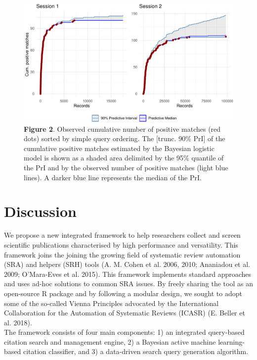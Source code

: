\documentclass{article}
\begin{document}
\begin{figure}
\centering
\includegraphics{Manuscript_files/figure-latex/performance_plot-1.pdf}
\caption{\textbf{Figure 2}. Observed cumulative number of positive
matches (red dots) sorted by simple query ordering. The {[}trunc. 90\%
PrI{]} of the cumulative positive matches estimated by the Bayesian
logistic model is shown as a shaded area delimited by the 95\% quantile
of the PrI and by the observed number of positive matches (light blue
lines). A darker blue line represents the median of the PrI.}
\end{figure}

\hypertarget{discussion}{%
\section{Discussion}\label{discussion}}

We propose a new integrated framework to help researchers collect and
screen scientific publications characterised by high performance and
versatility. This framework joins the joining the growing field of
systematic review automation (SRA) and helpers (SRH) tools (A. M. Cohen
et al. 2006, 2010; Ananiadou et al. 2009; O'Mara-Eves et al. 2015). This
framework implements standard approaches and uses ad-hoc solutions to
common SRA issues. By freely sharing the tool as an open-source R
package and by following a modular design, we sought to adopt some of
the so-called Vienna Principles advocated by the International
Collaboration for the Automation of Systematic Reviews (ICASR) (E.
Beller et al. 2018).\\
The framework consists of four main components: 1) an integrated
query-based citation search and management engine, 2) a Bayesian active
machine learning-based citation classifier, and 3) a data-driven search
query generation algorithm.\\
\end{document}
